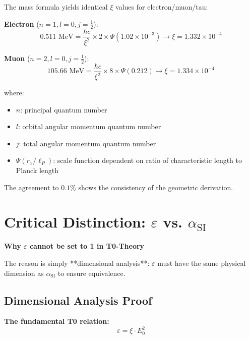 \documentclass[12pt,a4paper]{article}
\numberwithin{equation}{section}
\newcommand{\xipar}{\xi}
\newcommand{\epsilonT}{\varepsilon}
\newcommand{\alphaSI}{\alpha_{\text{SI}}}
\newcommand{\Eo}{E_0}
\begin{document}
	The mass formula yields identical $\xipar$ values for electron/muon/tau:
	
	\textbf{Electron} ($n=1, l=0, j=\frac{1}{2}$):
	\begin{equation}
		0.511 \text{ MeV} = \frac{\hbar c}{\xipar^2} \times 2 \times \Psi(1.02 \times 10^{-3}) \rightarrow \xipar = 1.332 \times 10^{-4}
		\label{eq:xi_electron}
	\end{equation}
	
	\textbf{Muon} ($n=2, l=0, j=\frac{1}{2}$):
	\begin{equation}
		105.66 \text{ MeV} = \frac{\hbar c}{\xipar^2} \times 8 \times \Psi(0.212) \rightarrow \xipar = 1.334 \times 10^{-4}
		\label{eq:xi_muon}
	\end{equation}
	
	where:
	\begin{itemize}
		\item $n$: principal quantum number
		\item $l$: orbital angular momentum quantum number
		\item $j$: total angular momentum quantum number
		\item $\Psi(r_x/\ell_P)$: scale function dependent on ratio of characteristic length to Planck length
	\end{itemize}
	
	The agreement to $0.1\%$ shows the consistency of the geometric derivation.
	
	\section{Critical Distinction: $\epsilonT$ vs. $\alphaSI$}
	
	\begin{tcolorbox}[title={\textbf{FUNDAMENTAL CONCEPTUAL CLARIFICATION}},colframe=red,colback=red!5]
		\textbf{Why $\epsilonT$ cannot be set to 1 in T0-Theory}
		
		The reason is simply **dimensional analysis**: $\epsilonT$ must have the same physical dimension as $\alphaSI$ to ensure equivalence.
	\end{tcolorbox}
	
	\subsection{Dimensional Analysis Proof}
	
	\textbf{The fundamental T0 relation:}
	\begin{equation}
		\epsilonT = \xipar \cdot \Eo^2
		\label{eq:epsilon_fundamental}
	\end{equation}
	
\end{document}
